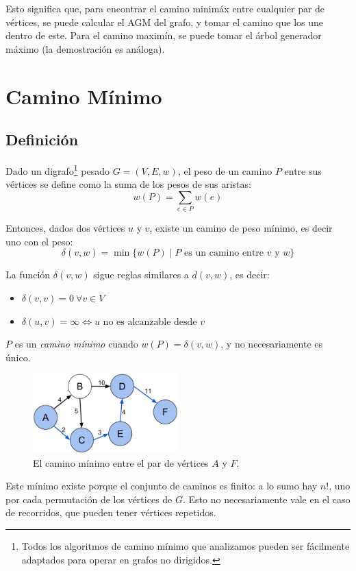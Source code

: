 \documentclass[a4paper]{report}
\begin{document}
Esto significa que, para encontrar el camino minimáx entre cualquier par de vértices, se puede calcular el AGM del grafo, y tomar el camino que los une dentro de este. Para el camino maximín, se puede tomar el árbol generador máximo (la demostración es análoga).


\chapter{Camino Mínimo}

\section{Definición}

Dado un digrafo\footnote{Todos los algoritmos de camino mínimo que analizamos pueden ser fácilmente adaptados para operar en grafos no dirigidos.} pesado $G = (V, E, w)$, el peso de un camino $P$ entre sus vértices se define como la suma de los pesos de sus aristas:
$$w(P) = \sum_{e \in P} w(e)$$

Entonces, dados dos vértices $u$ y $v$, existe un camino de peso mínimo, es decir uno con el peso:
$$\delta(v, w) = \min{\{w(P) \mid P \text{ es un camino entre $v$ y $w$}\}}$$

La función $\delta(v, w)$ sigue reglas similares a $d(v, w)$, es decir:
\begin{itemize}
    \item $\delta(v, v) = 0\ \forall v \in V$
    \item $\delta(u, v) = \infty \iff \text{$u$ no es alcanzable desde $v$}$
\end{itemize}

$P$ es un \textit{camino mínimo} cuando $w(P) = \delta(v, w)$, y no necesariamente es único.

\begin{figure}[H]
    \centering
    \includegraphics[width=0.5\textwidth]{ejemplo_camino_minimo.png}
    \caption*{El camino mínimo entre el par de vértices $A$ y $F$.}
\end{figure}

Este mínimo existe porque el conjunto de caminos es finito: a lo sumo hay $n!$, uno por cada permutación de los vértices de $G$. Esto no necesariamente vale en el caso de recorridos, que pueden tener vértices repetidos.
\end{document}
